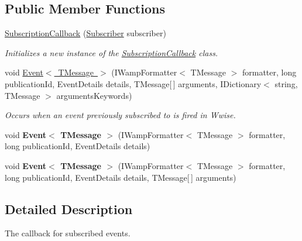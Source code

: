 \subsection*{Public Member Functions}
\begin{DoxyCompactItemize}
\item 
\mbox{\hyperlink{class_waapi_c_s_1_1_communication_1_1_subscription_callback_ad0e9e4549d6c2893f86c5afc4a4c4b4b}{Subscription\+Callback}} (\mbox{\hyperlink{class_waapi_c_s_1_1_communication_1_1_subscriber}{Subscriber}} subscriber)
\begin{DoxyCompactList}\small\item\em Initializes a new instance of the \mbox{\hyperlink{class_waapi_c_s_1_1_communication_1_1_subscription_callback}{Subscription\+Callback}} class. \end{DoxyCompactList}\item 
void \mbox{\hyperlink{class_waapi_c_s_1_1_communication_1_1_subscription_callback_a6cf96d1a3a3a458b8ef28b18d9aa3b4e}{Event$<$ T\+Message $>$}} (I\+Wamp\+Formatter$<$ T\+Message $>$ formatter, long publication\+Id, Event\+Details details, T\+Message\mbox{[}$\,$\mbox{]} arguments, I\+Dictionary$<$ string, T\+Message $>$ arguments\+Keywords)
\begin{DoxyCompactList}\small\item\em Occurs when an event previously subscribed to is fired in Wwise. \end{DoxyCompactList}\item 
\mbox{\label{class_waapi_c_s_1_1_communication_1_1_subscription_callback_a3de5a41938f9a9bc395a1d8d6e31f125}} 
void {\bfseries Event$<$ T\+Message $>$} (I\+Wamp\+Formatter$<$ T\+Message $>$ formatter, long publication\+Id, Event\+Details details)
\item 
\mbox{\label{class_waapi_c_s_1_1_communication_1_1_subscription_callback_a0c02ffb8ef5229586e4a170e98c4d7df}} 
void {\bfseries Event$<$ T\+Message $>$} (I\+Wamp\+Formatter$<$ T\+Message $>$ formatter, long publication\+Id, Event\+Details details, T\+Message\mbox{[}$\,$\mbox{]} arguments)
\end{DoxyCompactItemize}


\subsection{Detailed Description}
The callback for subscribed events. 

